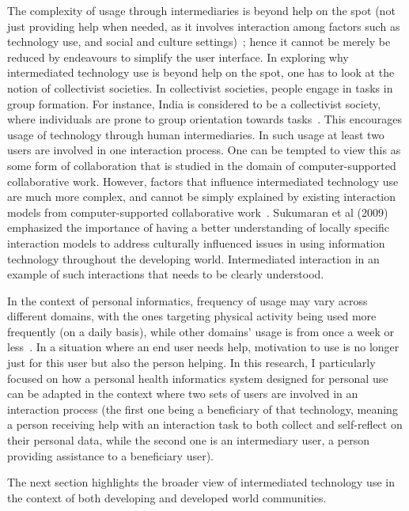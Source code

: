 The complexity of usage through intermediaries is beyond help on the spot (not just providing help when needed, as it involves interaction among factors such as technology use, and social and culture settings)~\citep{sambasivan2010}; hence it cannot be merely be reduced by endeavours to simplify the user interface. In exploring why intermediated technology use is beyond help on the spot, one has to look at the notion of collectivist societies. In collectivist societies, people engage in tasks in group formation. For instance, India is considered to be a collectivist society, where individuals are prone to group orientation towards tasks~\citep{parikh2006}. This encourages usage of technology through human intermediaries. In such usage at least two users are involved in one interaction process. One can be tempted to view this as some form of collaboration that is studied in the domain of computer-supported collaborative work. However, factors that influence intermediated technology use are much more complex, and cannot be simply explained by existing interaction models from computer-supported collaborative work~\citep{parikh2006}. Sukumaran et al (2009) emphasized the importance of having a better understanding of locally specific interaction models to address culturally influenced issues in using information technology throughout the developing world. Intermediated interaction in an example of such interactions that needs to be clearly understood.

In the context of personal informatics, frequency of usage may vary across different domains, with the ones targeting physical activity being used more frequently (on a daily basis), while other domains' usage is from once a week or less~\citep{epstein2015lived}. In a situation where an end user needs help, motivation to use is no longer just for this user but also the person helping. In this research, I particularly focused on how a personal health informatics system  designed for personal use can be adapted in the context where two sets of users are involved in an interaction process (the first one being a beneficiary of that technology, meaning a person receiving help with an interaction task to both collect and self-reflect on their personal data, while the second one is an intermediary user, a person providing assistance to a beneficiary user). 

The next section highlights the broader view of intermediated technology use in the context of both developing and developed world communities.  

